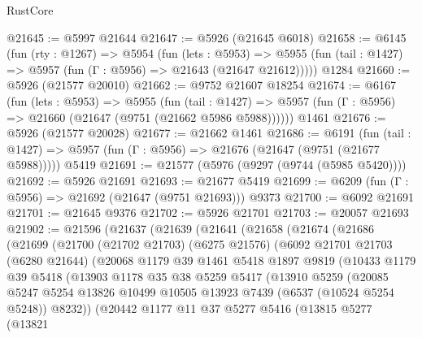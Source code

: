 \begin{lexlean}{RustCore}
\begin{coremodule}
@21645 := @5997 @21644
@21647 := @5926 (@21645 @6018)
@21658 := @6145
    (fun (rty : @1267) =>
    @5954
      (fun (lets : @5953) =>
      @5955 (fun (tail : @1427) => @5957 (fun (Γ : @5956) => @21643 (@21647 @21612)))))
    @1284
@21660 := @5926 (@21577 @20010)
@21662 := @9752 @21607 @18254
@21674 := @6167
    (fun (lets : @5953) =>
    @5955
      (fun (tail : @1427) =>
      @5957 (fun (Γ : @5956) => @21660 (@21647 (@9751 (@21662 @5986 @5988))))))
    @1461
@21676 := @5926 (@21577 @20028)
@21677 := @21662 @1461
@21686 := @6191
    (fun (tail : @1427) => @5957 (fun (Γ : @5956) => @21676 (@21647 (@9751 (@21677 @5988)))))
    @5419
@21691 := @21577 (@5976 (@9297 (@9744 (@5985 @5420))))
@21692 := @5926 @21691
@21693 := @21677 @5419
@21699 := @6209 (fun (Γ : @5956) => @21692 (@21647 (@9751 @21693))) @9373
@21700 := @6092 @21691
@21701 := @21645 @9376
@21702 := @5926 @21701
@21703 := @20057 @21693
@21902 := @21596
    (@21637
      (@21639
        (@21641
          (@21658
            (@21674
              (@21686
                (@21699
                  (@21700
                    (@21702 @21703)
                    (@6275 @21576)
                    (@6092
                      @21701
                      @21703
                      (@6280 @21644)
                      (@20068
                        @1179
                        @39
                        @1461
                        @5418
                        @1897
                        @9819
                        (@10433
                          @1179
                          @39
                          @5418
                          (@13903
                            @1178
                            @35
                            @38
                            @5259
                            @5417
                            (@13910
                              @5259
                              (@20085
                                @5247
                                @5254
                                @13826
                                @10499
                                @10505
                                @13923
                                @7439
                                (@6537 (@10524 @5254 @5248))
                                @8232))
                            (@20442
                              @1177
                              @11
                              @37
                              @5277
                              @5416
                              (@13815
                                @5277
                                (@13821

\end{coremodule}
\end{lexlean}
